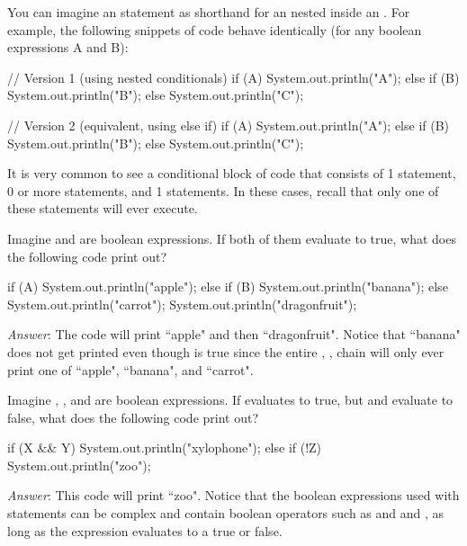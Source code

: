 You can imagine an  statement as shorthand for an  nested inside an . For example, the following snippets of code behave identically (for any boolean expressions A and B):

\begin{code}
// Version 1 (using nested conditionals)
if (A) {
    System.out.println("A");
} else {
    if (B) {
        System.out.println("B");
    } else {
        System.out.println("C");
    }
}

// Version 2 (equivalent, using else if)
if (A) {
    System.out.println("A");
} else if (B) {
    System.out.println("B");
} else {
    System.out.println("C");
}
\end{code}

It is very common to see a conditional block of code that consists of 1  statement, 0 or more  statements, and 1  statements. In these cases, recall that only one of these statements will ever execute.

\begin{example}
Imagine  and  are boolean expressions. If both of them evaluate to true, what does the following code print out?

\begin{code}
if (A) {
    System.out.println("apple");
} else if (B) {
    System.out.println("banana");
} else {
    System.out.println("carrot");
} 
System.out.println("dragonfruit");
\end{code}

\emph{Answer}: The code will print ``apple" and then ``dragonfruit". Notice that ``banana" does not get printed even though  is true since the entire , ,  chain will only ever print one of ``apple", ``banana", and ``carrot". 
\end{example}

\begin{example}
Imagine , , and  are boolean expressions. If  evaluates to true, but  and  evaluate to false, what does the following code print out?

\begin{code}
if (X && Y) {
    System.out.println("xylophone");
} else if (!Z) {
    System.out.println("zoo");
}
\end{code}

\emph{Answer}: This code will print ``zoo". Notice that the boolean expressions used with  statements can be complex and contain boolean operators such as \ic{\&\&} and \ic{||} and \ic{!}, as long as the expression evaluates to a true or false.
\end{example}

